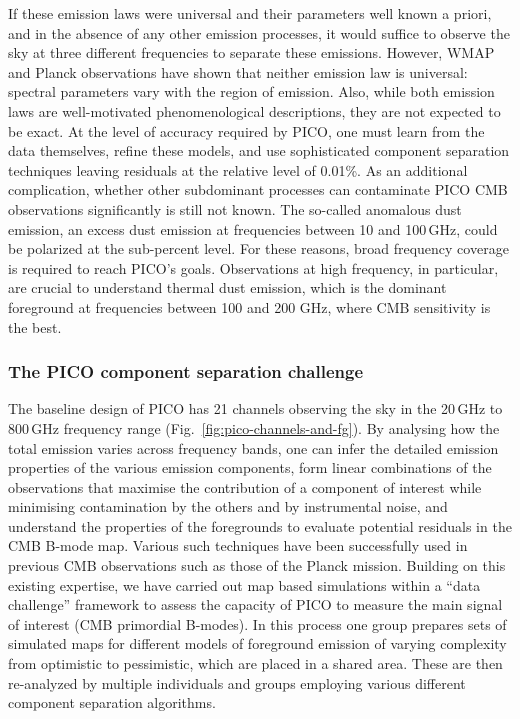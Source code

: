 \documentclass[PICOReport.tex]{subfiles}
\begin{document}
If these emission laws were universal and their parameters well known a priori, and in the absence of any other emission processes, it would suffice to observe the sky at three different frequencies to separate these emissions. However, WMAP and Planck observations have shown that neither emission law is universal: spectral parameters vary with the region of emission. Also, while both emission laws are well-motivated phenomenological descriptions, they are not expected to be exact. At the level of accuracy required by PICO, one must learn from the data themselves, refine these models, and use sophisticated component separation techniques leaving residuals at the relative level of 0.01\%. As an additional complication, whether other subdominant processes can contaminate PICO CMB observations significantly is still not known. The so-called anomalous dust emission, an excess dust emission at frequencies between 10 and 100\,GHz, could be polarized at the sub-percent level. For these reasons, broad frequency coverage is required to reach PICO's goals. Observations at high frequency, in particular, are crucial to understand thermal dust emission, which is the dominant foreground at frequencies  between 100 and 200 GHz, where CMB sensitivity is the best. 

\subsubsection{The PICO component separation challenge}

The baseline design of PICO has 21 channels observing the sky in the 20\,GHz to 800\,GHz frequency range (Fig.~\ref{fig:pico-channels-and-fg}). By analysing how the total emission varies across frequency bands, one can infer the detailed emission properties of the various emission components, form linear combinations of the observations that maximise the contribution of a component of interest while minimising contamination by the others and by instrumental noise, and understand the properties of the foregrounds to evaluate potential residuals in the CMB B-mode map. Various such techniques have been successfully used in previous CMB observations such as those of the Planck mission. Building on this existing expertise, we have carried out map based simulations within a ``data challenge'' framework to assess the capacity of PICO to measure the main signal of interest (CMB primordial B-modes). In this process one group prepares sets of simulated maps for different models of foreground emission of varying complexity from optimistic to pessimistic, which are placed in a shared area. These are then re-analyzed by multiple individuals and groups employing various different component separation algorithms.
\end{document}

